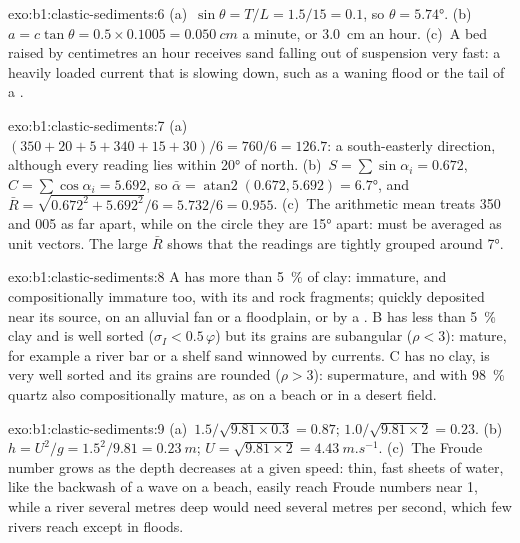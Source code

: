\begin{solution}{exo:b1:clastic-sediments:6}
(a)~$\sin\theta = T/L = 1.5/15 = 0.1$, so $\theta = \ang{5.74}$. (b)~$a =
c\tan\theta = 0.5 \times 0.1005 = \qty{0.050}{cm}$ a minute, or
\qty{3.0}{cm} an hour. (c)~A bed raised by centimetres an hour receives sand
falling out of suspension very fast: a heavily loaded current that is slowing
down, such as a waning flood or the tail of a .
\end{solution}

\begin{solution}{exo:b1:clastic-sediments:7}
(a)~$(350 + 20 + 5 + 340 + 15 + 30)/6 = 760/6 = 126.7$: a south-easterly
direction, although every reading lies within \ang{20} of north. (b)~$S =
\sum\sin\alpha_i = 0.672$, $C = \sum\cos\alpha_i = 5.692$, so $\bar\alpha =
\operatorname{atan2}(0.672, 5.692) = \ang{6.7}$, and $\bar R =
\sqrt{0.672^2 + 5.692^2}/6 = 5.732/6 = 0.955$. (c)~The arithmetic mean treats
350 and 005 as far apart, while on the circle they are \ang{15} apart: 
must be averaged as unit vectors. The large $\bar R$ shows that the readings are
tightly grouped around \ang{7}.
\end{solution}

\begin{solution}{exo:b1:clastic-sediments:8}
A has more than \qty{5}{\percent} of clay: immature, and compositionally
immature too, with its  and rock fragments; quickly deposited near its
source, on an alluvial fan or a floodplain, or by a . B has less
than \qty{5}{\percent} clay and is well sorted ($\sigma_I < 0.5\,\varphi$) but its
grains are subangular ($\rho < 3$): mature, for example a river bar or a shelf
sand winnowed by currents. C has no clay, is very well sorted and its grains are
rounded ($\rho > 3$): supermature, and with \qty{98}{\percent} quartz also
compositionally mature, as on a beach or in a desert  field.
\end{solution}

\begin{solution}{exo:b1:clastic-sediments:9}
(a)~$1.5/\sqrt{9.81 \times 0.3} = 0.87$; $1.0/\sqrt{9.81 \times 2} = 0.23$.
(b)~$h = U^2/g = 1.5^2/9.81 = \qty{0.23}{m}$; $U = \sqrt{9.81 \times 2} =
\qty{4.43}{m.s^{-1}}$. (c)~The Froude number grows as the depth decreases at a
given speed: thin, fast sheets of water, like the backwash of a wave on a beach,
easily reach Froude numbers near 1, while a river several metres deep would
need several metres per second, which few rivers reach except in floods.
\end{solution}

